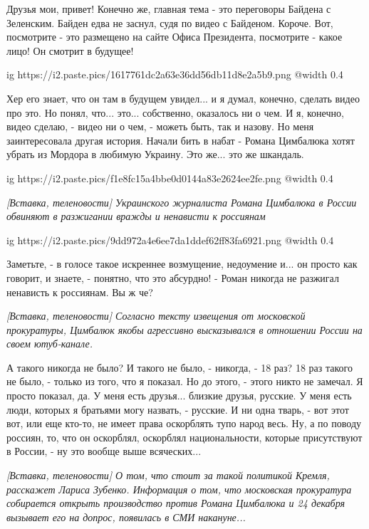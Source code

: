 \begin{multicols}{2} %
Друзья мои, привет! Конечно же, главная тема - это переговоры Байдена с
Зеленским. Байден едва не заснул, судя по видео с Байденом. Короче. Вот,
посмотрите - это размещено на сайте Офиса Президента, посмотрите - какое лицо!
Он смотрит в будущее!

\ifcmt
  ig https://i2.paste.pics/1617761dc2a63e36dd56db11d8e2a5b9.png
  @width 0.4
\fi

Хер его знает, что он там в будущем увидел... и я думал, конечно, сделать видео
про это. Но понял, что... это... собственно, оказалось ни о чем. И я, конечно,
видео сделаю, - видео ни о чем, - можеть быть, так и назову. Но меня
заинтересовала другая история. Начали бить в набат - Романа Цимбалюка хотят
убрать из Мордора в любимую Украину. Это же... это же шкандаль. 

\ifcmt
  ig https://i2.paste.pics/f1e8fc15a4bbe0d0144a83e2624ee2fe.png
  @width 0.4
\fi

{\em\color{blue}
[Вставка, теленовости]
Украинского журналиста Романа Цимбалюка в России обвиняют в разжигании вражды и
ненависти к россиянам
}

\ifcmt
  ig https://i2.paste.pics/9dd972a4e6ee7da1ddef62ff83fa6921.png
  @width 0.4
\fi

Заметьте, - в голосе такое искреннее возмущение, недоумение и... он просто как говорит, и знаете, - 
понятно, что это абсурдно! - Роман никогда не разжигал ненависть к россиянам. Вы ж че?

{\em\color{blue}
[Вставка, теленовости]
Согласно тексту извещения от московской прокуратуры, Цимбалюк якобы агрессивно
высказывался в отношении России на своем ютуб-канале.
}

А такого никогда не было? И такого не было, - никогда, - 18 раз? 18 раз такого
не было, - только из того, что я показал.  Но до этого, - этого никто не
замечал. Я просто показал, да. У меня есть друзья... близкие друзья, русские. У
меня есть люди, которых я братьями могу назвать, - русские. И ни одна тварь, -
вот этот вот, или еще кто-то, не имеет права оскорблять тупо народ весь. Ну, а
по поводу россиян, то, что он оскорблял, оскорблял национальности, которые
присутствуют в России, - ну это вообще выше всяческих... 

{\em\color{blue}
[Вставка, теленовости]
О том, что стоит за такой политикой Кремля, расскажет Лариса Зубенко. Информация о том, что 
московская прокуратура собирается открыть производство против Романа Цимбалюка и 24 декабря
вызывает его на допрос, появилась в СМИ накануне...
}


\end{multicols} %
